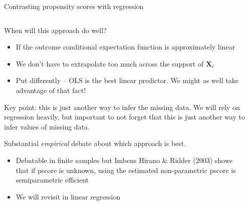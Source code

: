 \documentclass[notes,11pt, aspectratio=169]{beamer}
\newenvironment{wideitemize}{\itemize\addtolength{\itemsep}{10pt}}{\enditemize}
\begin{document}
\begin{frame}{Contrasting propensity scores with regression}
\begin{columns}[T] %
\begin{column}{.8\textwidth}

  \begin{wideitemize}
  \item When will this approach do well?
    \begin{itemize}
    \item If the outcome conditional expectation function is approximately linear
    \item We don't have to extrapolate too much across the support of $\mathbf{X}_{i}$
    \item Put differently -- OLS is the best linear predictor. We might as well take advantage of that fact!
    \end{itemize}
  \item Key point: this is just another way to infer the missing
    data. We will rely on regression heavily, but important to not
    forget that this is just another way to infer values of missing
    data.
  \item Substantial \emph{empirical} debate about which approach is best.
    \begin{itemize}
    \item Debatable in finite samples but Imbens Hirano \& Ridder
      (2003) shows that if pscore is unknown, using the estimated
      non-parametric pscore is semiparametric efficient
    \item We will revisit in linear regression
    \end{itemize}
  \end{wideitemize}
\end{column}%
\hfill%
\begin{column}{.4\textwidth}

\end{column}%
\end{columns}
\end{frame}
\end{document}
